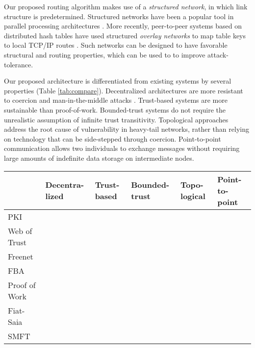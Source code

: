 \documentclass[10pt,letterpaper]{article}
\newcommand{\cmark}{\ding{51}}
\begin{document}
Our proposed routing algorithm makes use of a
{\em structured network}, in which link structure is predetermined.
Structured networks have been a popular tool in parallel processing
architectures \cite{kshemkalyani_distributed_2008}.
More recently, peer-to-peer systems based on distributed hash tables have used
structured {\em overlay networks} to map table keys to local TCP/IP routes
\cite{lua_survey_2005,korzun_structured_2013}.
Such networks can be designed to have favorable structural and routing
properties,
which can be used to to improve attack-tolerance.

Our proposed architecture is differentiated from existing systems by several
properties (Table \ref{tab:compare}).
Decentralized architectures are more resistant to coercion
\cite{grewal_caveat_2013}
and man-in-the-middle attacks \cite{nayak_different_2010}.
Trust-based systems are more sustainable than proof-of-work.
Bounded-trust systems do not require the unrealistic assumption of infinite
trust transitivity.
Topological approaches address the root cause of vulnerability
in heavy-tail networks,
rather than relying on technology that can be side-stepped through coercion.
Point-to-point communication allows two individuals to exchange messages
without requiring large amounts of indefinite data storage on intermediate
nodes.

\begin{table*}[t!]
\caption{Comparison of attack-tolerant network communication architectures.\label{tab:compare}}
\begin{center}
\begin{tabular}{l|p{0.6in}p{0.6in}p{0.6in}p{0.6in}p{0.6in}}
                              & Decentra-lized & Trust-based & Bounded-trust & Topo-logical & Point-to-point \\
\hline
PKI            &               & \cmark      & \cmark        &             & \cmark     \\
Web of Trust   & \cmark        & \cmark      &               &             & \cmark     \\
Freenet        & \cmark        & \cmark      & \cmark        &             &            \\
FBA            & \cmark        & \cmark      & \cmark        &             & \cmark     \\
Proof of Work  & \cmark        &             & \cmark        &             &            \\
Fiat-Saia      & \cmark        & \cmark      & \cmark        & \cmark      &            \\
SMFT           & \cmark        & \cmark      & \cmark        & \cmark      & \cmark     \\
\hline
\end{tabular}
\end{center}
\end{table*}
\end{document}
